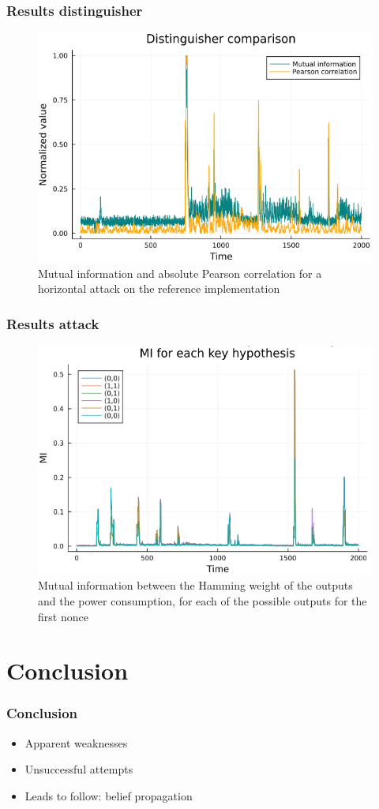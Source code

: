 \documentclass{beamer}
\begin{document}
	\begin{frame}
		\frametitle{Results distinguisher}
		\begin{figure}
			\centering
			\includegraphics[scale=0.3]{corr_vs_MI_hHW}
			\caption{Mutual information and absolute Pearson correlation for a horizontal attack on the reference implementation}
			\label{corvsMI}
		\end{figure}
	\end{frame}
	
	\begin{frame}
		\frametitle{Results attack}
		\begin{figure}[h]
			\centering
			\includegraphics[scale=0.3]{nonces_alea}
			\caption{Mutual information between the Hamming weight of the outputs and the power consumption, for each of the possible outputs for the first nonce}
			\label{all_alea}
		\end{figure}
	\end{frame}
	
	\section{Conclusion}
	\begin{frame}
		\frametitle{Conclusion}
		\begin{itemize}
			\item Apparent weaknesses
			\item Unsuccessful attempts
			\item Leads to follow: belief propagation
		\end{itemize}
	\end{frame}
\end{document}
